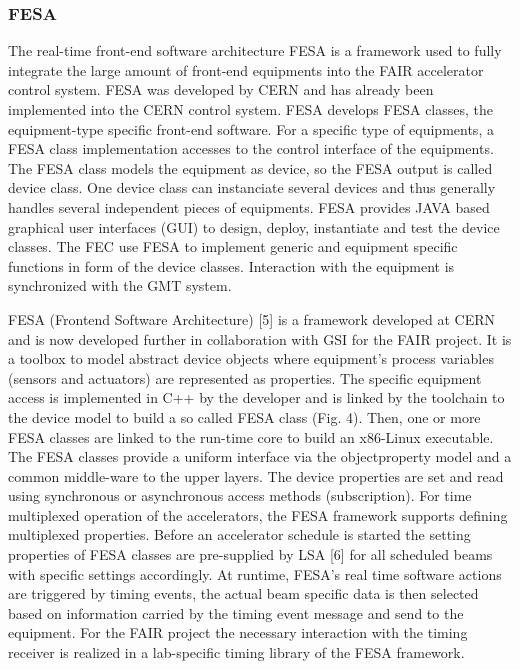 \subsubsection{FESA}
The real-time front-end software architecture FESA is a framework used to fully integrate the large amount of front-end equipments into the FAIR accelerator control system. FESA was developed by CERN and has already been implemented into the CERN control system. FESA develops FESA classes, the equipment-type specific front-end software. For a specific type of equipments, a FESA class implementation accesses to the control interface of the equipments. The FESA class models the equipment as device, so the FESA output is called device class. One device class can instanciate several devices and thus generally handles several independent pieces of equipments.  FESA provides JAVA based graphical user interfaces (GUI) to design, deploy, instantiate and test the device classes. The FEC use FESA to implement generic and equipment specific functions in form of the device classes. Interaction with the equipment is synchronized with the GMT system. 

FESA (Frontend Software Architecture) [5] is a framework developed at CERN and is now developed further in collaboration with GSI for the FAIR project. It is a toolbox to model abstract device objects where equipment’s process variables (sensors and actuators) are represented as properties. The specific equipment access is implemented in C++ by the developer and is linked by the toolchain
to the device model to build a so called FESA class (Fig. 4). Then, one or more FESA classes are linked to the run-time core to build an x86-Linux executable. The
FESA classes provide a uniform interface via the objectproperty model and a common middle-ware to the upper layers. The device properties are set and read using synchronous or asynchronous access methods (subscription). For time multiplexed operation of the accelerators, the FESA framework supports defining multiplexed properties. Before an accelerator schedule is started the setting properties of FESA classes are pre-supplied by LSA [6] for all scheduled beams with specific settings accordingly. At runtime, FESA’s real time software actions are triggered by timing events, the actual beam specific data is then selected based on information carried by the timing event message and send to the equipment. For the FAIR project the necessary interaction with the timing receiver is realized in a
lab-specific timing library of the FESA framework.


